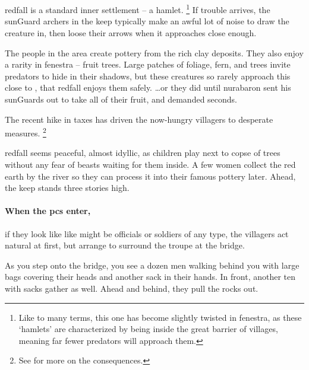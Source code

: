 \section{}
\label{redfallVillage}
\begin{multicols}{2}

\Gls{redfall} is a standard inner settlement -- a hamlet.%
\footnote{Like to many terms, this one has become slightly twisted in \gls{fenestra}, as these `hamlets' are characterized by being inside the great barrier of \glspl{village}, meaning far fewer predators will approach them.}
If trouble arrives, the \gls{sunGuard} archers in the keep typically make an awful lot of noise to draw the creature in, then loose their arrows when it approaches close enough.


The people in the area create pottery from the rich clay deposits.
They also enjoy a rarity in \gls{fenestra} -- fruit trees.
Large patches of foliage, fern, and trees invite predators to hide in their shadows, but these creatures so rarely approach this close to , that \gls{redfall} enjoys them safely.
\ldots or they did until \gls{nurabaron} sent his \glspl{sunGuard} out to take all of their fruit, and demanded seconds.

The recent hike in taxes has driven the now-hungry villagers to desperate measures.%
\footnote{See  for more on the consequences.}

\begin{boxtext}
  \Gls{redfall} seems peaceful, almost idyllic, as children play next to copse of trees without any fear of beasts waiting for them inside.
  A few women collect the red earth by the river so they can process it into their famous pottery later.
  Ahead, the keep stands three stories high.
\end{boxtext}

\paragraph{When the \glspl{pc} enter,}
if they look like like might be officials or soldiers of any type, the villagers act natural at first, but arrange to surround the troupe at the bridge.

\begin{boxtext}
  As you step onto the bridge, you see a dozen men walking behind you with large bags covering their heads and another sack in their hands.
  In front, another ten with sacks gather as well.
  Ahead and behind, they pull the rocks out.


\end{boxtext}
\end{multicols}
